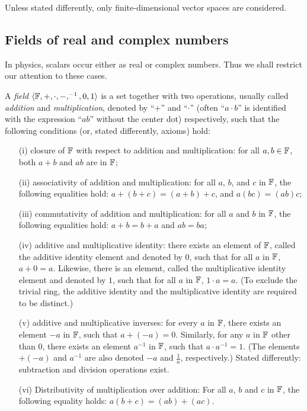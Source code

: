Unless stated differently, only
finite-dimensional vector spaces are considered.

\subsection{Fields of real and complex numbers}

In physics, scalars occur either as real or complex numbers.
Thus we shall restrict our attention to these cases.

A {\em field}  $\langle  {\Bbb F} , +, \cdot , -, ^{-1}, 0, 1\rangle$
is a set together with two operations,
usually called {\em addition} and {\em multiplication},   denoted by ``$+$'' and ``$\cdot$''
(often  ``$a\cdot b$'' is identified with the expression ``$ab$'' without the center dot)
respectively, such that the following conditions (or, stated differently, axioms) hold:
\begin{itemize}
\item[(i)]
closure of ${\Bbb F}$ with respect to addition and multiplication:
for all $a, b \in {\Bbb F}$, both $a + b$ and $a   b$ are in ${\Bbb F}$;
\item[(ii)]
associativity of addition and multiplication:
for all $a$, $b$, and $c$ in ${\Bbb F}$,
the following equalities hold: $a + (b + c) = (a + b) + c$,
and
$a (b c) = (a  b) c$;
\item[(iii)]
commutativity of addition and multiplication:
for all $a$ and $b$ in ${\Bbb F}$, the following equalities hold: $a + b = b + a$ and $a b = b  a$;
\item[(iv)]
additive and multiplicative identity:
there exists an element of ${\Bbb F}$,
called the additive identity element and denoted by $0$, such that for all $a$ in ${\Bbb F}$,
$a + 0 = a$.
Likewise, there is an element, called the multiplicative identity element and denoted by $1$,
such that for all $a$ in ${\Bbb F}$, $1 \cdot a  = a$.
(To exclude the trivial ring, the additive identity and the multiplicative
identity are required to be distinct.)
\item[(v)]
additive and multiplicative inverses:
for every $a$ in ${\Bbb F}$, there exists an element $-a$ in ${\Bbb F}$, such that $a + (-a) = 0$.
Similarly, for any $a$ in ${\Bbb F}$ other than $0$, there exists an element $a^{-1}$ in ${\Bbb F}$,
such that $a \cdot a^{-1} = 1$.
(The elements $+ (-a)$ and  $a^{-1}$
are also denoted $-a$ and $\frac{1}{a}$, respectively.)
Stated differently: subtraction and division operations exist.
\item[(vi)]
Distributivity of multiplication over addition:
For all $a$, $b$ and $c$ in ${\Bbb F}$, the following equality holds:
$a (b + c) = (a  b) + (a  c)$.
\end{itemize}

